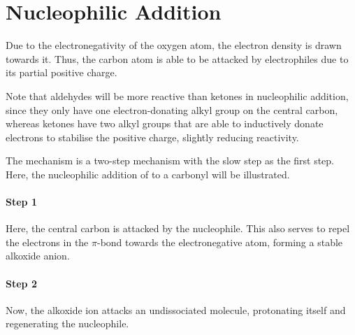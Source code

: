 	\pagebreak
	\hypertarget{AppendixNucleophilicAddition}{}
	\section{Nucleophilic Addition}

		Due to the electronegativity of the oxygen atom, the electron density is drawn towards it. Thus, the carbon atom is able
		to be attacked by electrophiles due to its partial positive charge.

		Note that aldehydes will be more reactive than ketones in nucleophilic addition, since they only have one electron-donating
		alkyl group on the central carbon, whereas ketones have two alkyl groups that are able to inductively donate electrons to
		stabilise the positive charge, slightly reducing reactivity.

		The mechanism is a two-step mechanism with the slow step as the first step. Here, the nucleophilic addition of  to
		a carbonyl will be illustrated.

		\paragraph{Step 1}

		Here, the central carbon is attacked by the nucleophile. This also serves to repel the electrons in the $\pi$-bond towards the
		electronegative  atom, forming a stable alkoxide anion.



		\paragraph{Step 2}

		Now, the alkoxide ion attacks an undissociated  molecule, protonating itself and regenerating the  nucleophile.

